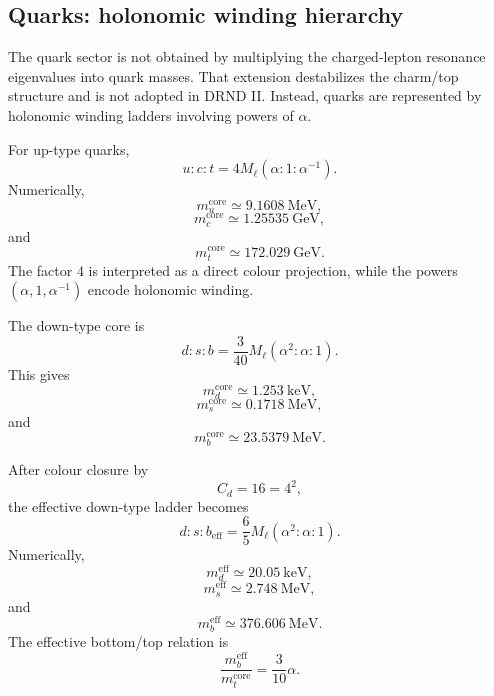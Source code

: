 \documentclass[12pt]{iopart}
\begin{document}
\subsection{Quarks: holonomic winding hierarchy}

The quark sector is not obtained by multiplying the charged-lepton resonance eigenvalues into quark masses. That extension destabilizes the charm/top structure and is not adopted in DRND II. Instead, quarks are represented by holonomic winding ladders involving powers of \(\alpha\).

For up-type quarks,
\begin{equation}
u:c:t
=
4M_\ell(\alpha:1:\alpha^{-1}).
\label{eq:up_type_quarks}
\end{equation}
Numerically,
\begin{equation}
m_u^{\mathrm{core}}\simeq 9.1608~\mathrm{MeV},
\end{equation}
\begin{equation}
m_c^{\mathrm{core}}\simeq 1.25535~\mathrm{GeV},
\end{equation}
and
\begin{equation}
m_t^{\mathrm{core}}\simeq 172.029~\mathrm{GeV}.
\end{equation}
The factor \(4\) is interpreted as a direct colour projection, while the powers \((\alpha,1,\alpha^{-1})\) encode holonomic winding.

The down-type core is
\begin{equation}
d:s:b
=
\frac{3}{40}M_\ell(\alpha^2:\alpha:1).
\label{eq:down_type_core}
\end{equation}
This gives
\begin{equation}
m_d^{\mathrm{core}}\simeq 1.253~\mathrm{keV},
\end{equation}
\begin{equation}
m_s^{\mathrm{core}}\simeq 0.1718~\mathrm{MeV},
\end{equation}
and
\begin{equation}
m_b^{\mathrm{core}}\simeq 23.5379~\mathrm{MeV}.
\end{equation}

After colour closure by
\begin{equation}
C_d=16=4^2,
\end{equation}
the effective down-type ladder becomes
\begin{equation}
d:s:b_{\mathrm{eff}}
=
\frac{6}{5}M_\ell(\alpha^2:\alpha:1).
\label{eq:down_type_effective}
\end{equation}
Numerically,
\begin{equation}
m_d^{\mathrm{eff}}\simeq 20.05~\mathrm{keV},
\end{equation}
\begin{equation}
m_s^{\mathrm{eff}}\simeq 2.748~\mathrm{MeV},
\end{equation}
and
\begin{equation}
m_b^{\mathrm{eff}}\simeq 376.606~\mathrm{MeV}.
\end{equation}
The effective bottom/top relation is
\begin{equation}
\frac{m_b^{\mathrm{eff}}}{m_t^{\mathrm{core}}}
=
\frac{3}{10}\alpha.
\end{equation}
\end{document}
